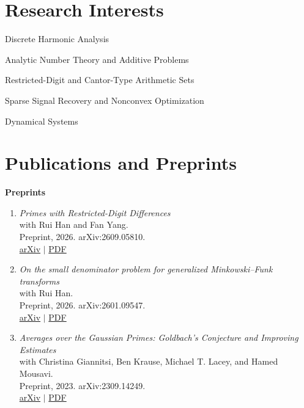 \documentclass[11pt]{article}
\newcommand{\publication}[4]{%
    \item \begin{minipage}[t]{\linewidth}
        \textit{#1}\\
        with #2\\
        #3\\
        #4
    \end{minipage}}
\begin{document}
\section{Research Interests}
\vspace{2 mm}
\begin{compactitem}


\item{Discrete Harmonic Analysis}
\item{Analytic Number Theory and Additive Problems}
\item{Restricted-Digit and Cantor-Type Arithmetic Sets}
\item{Sparse Signal Recovery and Nonconvex Optimization}
\item{Dynamical Systems}


\end{compactitem}

\section{Publications and Preprints}
\vspace{2 mm}

\textbf{Preprints}
\begin{enumerate}
\publication{Primes with Restricted-Digit Differences}
    {Rui Han and Fan Yang.}
    {Preprint, 2026. arXiv:2609.05810.}
    {\href{https://arxiv.org/abs/2609.05810}{arXiv} $\vert$ \href{https://arxiv.org/pdf/2609.05810}{PDF}}

\publication{On the small denominator problem for generalized Minkowski--Funk transforms}
    {Rui Han.}
    {Preprint, 2026. arXiv:2601.09547.}
    {\href{https://arxiv.org/abs/2601.09547}{arXiv} $\vert$ \href{https://arxiv.org/pdf/2601.09547}{PDF}}

\publication{Averages over the Gaussian Primes: Goldbach's Conjecture and Improving Estimates}
    {Christina Giannitsi, Ben Krause, Michael T. Lacey, and Hamed Mousavi.}
    {Preprint, 2023. arXiv:2309.14249.}
    {\href{https://arxiv.org/abs/2309.14249}{arXiv} $\vert$ \href{https://arxiv.org/pdf/2309.14249}{PDF}}
\end{enumerate}
\end{document}
